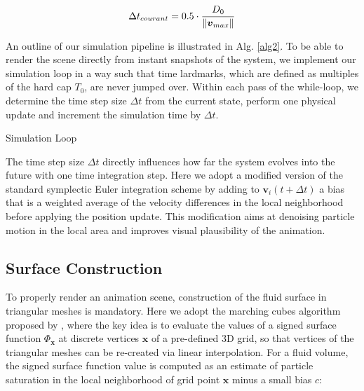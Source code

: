 \documentclass[
	11pt, 
	DIV10,
	ngerman,
	a4paper, 
	oneside, 
	headings=normal, 
	captions=tableheading,
	final, 
	numbers=noenddot
]{scrartcl}
\DeclarePairedDelimiter{\norm}{\lVert}{\rVert}
\begin{document}
\begin{equation}
	\label{eq16}
	\Delta t_{courant} = 0.5 \cdot \frac{D_{0}}{\norm{\boldsymbol{v}_{max}}}
\end{equation}

An outline of our simulation pipeline is illustrated in Alg. \ref{alg2}. To be able to render the scene directly from instant snapshots of the system, we implement our simulation loop in a way such that time lardmarks, which are defined as multiples of the hard cap $ T_{0} $, are never jumped over. Within each pass of the while-loop, we determine the time step size $ \Delta t $ from the current state, perform one physical update and increment the simulation time by $ \Delta t $.

\medskip
\begin{algorithm}[H]
	\SetAlgoLined
	\caption{\label{alg2} Simulation Loop}
\end{algorithm}
\medskip

The time step size $ \Delta t $ directly influences how far the system evolves into the future with one time integration step. Here we adopt a modified version of the standard symplectic Euler integration scheme by adding to $ \mathbf{v}_{i}(t + \Delta t) $ a bias that is a weighted average of the velocity differences in the local neighborhood before applying the position update. This modification aims at denoising particle motion in the local area and improves visual plausibility of the animation.

\subsection{Surface Construction}

To properly render an animation scene, construction of the fluid surface in triangular meshes is mandatory. Here we adopt the marching cubes algorithm proposed by \cite{lorensen1987marching}, where the key idea is to evaluate the values of a signed surface function $ \Phi_{\mathbf{x}} $ at discrete vertices $ \mathbf{x} $ of a pre-defined 3D grid, so that vertices of the triangular meshes can be re-created via linear interpolation. For a fluid volume, the signed surface function value is computed as an estimate of particle saturation in the local neighborhood of grid point $ \mathbf{x} $ minus a small bias $ c $:
\end{document}

